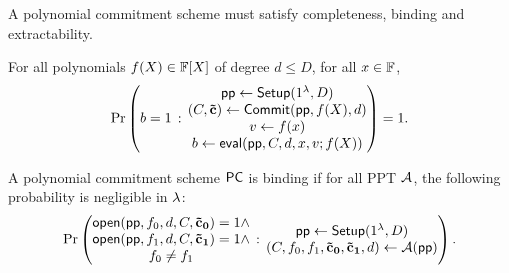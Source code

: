A polynomial commitment scheme must satisfy completeness, binding and extractability.

\begin{definition}[Completeness]
\label{def:pcs-comp}
For all polynomials $f(X) \in \mathbb{F}[X]$ of degree $d \leq D$, for all $x \in \mathbb{F}$,
\[
\Pr \left( 
\begin{matrix}
 b=1
\end{matrix}
 \,:\,
 \begin{matrix}
\mathsf{pp} \leftarrow \mathsf{Setup}(1^{\lambda},D) \\
 (C,\mathbf{\tilde{c}}) \leftarrow \mathsf{Commit}(\mathsf{pp}, f(X),d) \\
 v \leftarrow f(x) \\
 b \leftarrow \mathsf{eval}(\mathsf{pp},C,d,x,v;f(X))
\end{matrix}
 \right) = 1.
 \]
\end{definition}

\begin{definition}[Binding] 
\label{def:pcs-binding-app}
A polynomial commitment scheme $\mathsf{PC}$ is binding if for all PPT $\mathcal{A}$, the following probability is negligible in $\lambda$:
\[
\Pr \left( 
\begin{matrix}
 \mathsf{open}(\mathsf{pp},f_0,d,C,\mathbf{\tilde{c}_0}) =1 \wedge \\
 \mathsf{open}(\mathsf{pp},f_1,d,C,\mathbf{\tilde{c}_1}) = 1 \wedge \\
 f_0 \neq f_1
\end{matrix}
 \,:\,
 \begin{matrix}
\mathsf{pp} \leftarrow \mathsf{Setup}(1^{\lambda},D) \\
 (C,f_0,f_1,\mathbf{\tilde{c}_0}, \mathbf{\tilde{c}_1},d) \leftarrow \mathcal{A}(\mathsf{pp}) 
\end{matrix}
 \right).
 \]
\end{definition}

